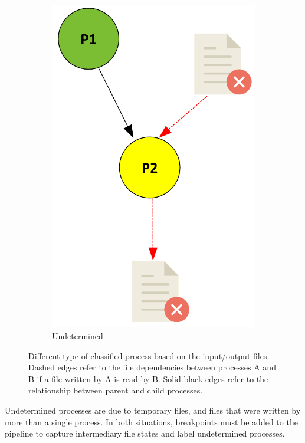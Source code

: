 \documentclass[a4paper,num-refs]{oup-contemporary}
\begin{document}
\begin{figure}
\begin{subfigure}{0.4\linewidth}
    \includegraphics[scale=0.34]{images/yellow.png}
    \caption{Undetermined}
    \label{fig:yellow}
\end{subfigure}
    \caption{Different type of classified process based on the input/output files.
  Dashed edges refer to the file dependencies between processes A and B 
  if a file written by A is read by B. Solid black edges refer to the 
  relationship between parent and child processes.}
    \label{fig:processes}
\end{figure}

Undetermined processes are due to temporary files, and files that were
written by more than a single process. In both situations, breakpoints must
be added to the pipeline to capture intermediary file states and label
undetermined processes.
\end{document}
